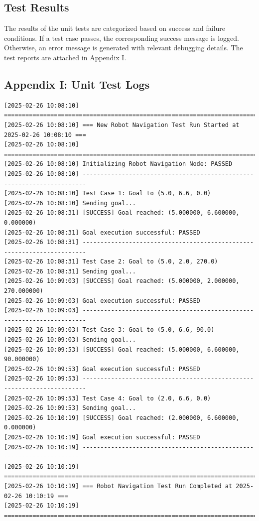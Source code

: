 \documentclass{CSSRforAfrica}
\begin{document}
\subsection{Test Results}
The results of the unit tests are categorized based on success and failure conditions. If a test case passes, the corresponding success message is logged. Otherwise, an error message is generated with relevant debugging details. The test reports are attached in Appendix I.

\newpage
\appendix

\begin{landscape} 
\section*{Appendix I: Unit Test Logs}

\small  
\begin{verbatim}
[2025-02-26 10:08:10] =======================================================================
[2025-02-26 10:08:10] === New Robot Navigation Test Run Started at 2025-02-26 10:08:10 ===
[2025-02-26 10:08:10] =======================================================================
[2025-02-26 10:08:10] Initializing Robot Navigation Node: PASSED
[2025-02-26 10:08:10] -----------------------------------------------------------------------
[2025-02-26 10:08:10] Test Case 1: Goal to (5.0, 6.6, 0.0)
[2025-02-26 10:08:10] Sending goal...
[2025-02-26 10:08:31] [SUCCESS] Goal reached: (5.000000, 6.600000, 0.000000)
[2025-02-26 10:08:31] Goal execution successful: PASSED
[2025-02-26 10:08:31] -----------------------------------------------------------------------
[2025-02-26 10:08:31] Test Case 2: Goal to (5.0, 2.0, 270.0)
[2025-02-26 10:08:31] Sending goal...
[2025-02-26 10:09:03] [SUCCESS] Goal reached: (5.000000, 2.000000, 270.000000)
[2025-02-26 10:09:03] Goal execution successful: PASSED
[2025-02-26 10:09:03] -----------------------------------------------------------------------
[2025-02-26 10:09:03] Test Case 3: Goal to (5.0, 6.6, 90.0)
[2025-02-26 10:09:03] Sending goal...
[2025-02-26 10:09:53] [SUCCESS] Goal reached: (5.000000, 6.600000, 90.000000)
[2025-02-26 10:09:53] Goal execution successful: PASSED
[2025-02-26 10:09:53] -----------------------------------------------------------------------
[2025-02-26 10:09:53] Test Case 4: Goal to (2.0, 6.6, 0.0)
[2025-02-26 10:09:53] Sending goal...
[2025-02-26 10:10:19] [SUCCESS] Goal reached: (2.000000, 6.600000, 0.000000)
[2025-02-26 10:10:19] Goal execution successful: PASSED
[2025-02-26 10:10:19] -----------------------------------------------------------------------
[2025-02-26 10:10:19] =======================================================================
[2025-02-26 10:10:19] === Robot Navigation Test Run Completed at 2025-02-26 10:10:19 ===
[2025-02-26 10:10:19] =======================================================================


\end{verbatim}
\end{landscape}
\end{document}
